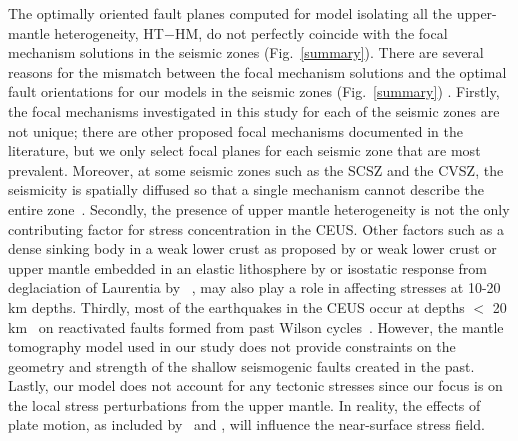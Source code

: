 \documentclass[draft,linenumbers]{agujournal2018}
\begin{document}
     The optimally oriented fault planes computed for model isolating all the upper-mantle heterogeneity, HT$-$HM,  do not perfectly coincide with the focal mechanism solutions in the seismic zones (Fig.~\ref{summary}). There are several reasons for the mismatch between the focal mechanism solutions and the optimal fault orientations for our models in the seismic zones (Fig.~\ref{summary}) . Firstly, the focal mechanisms investigated in this study for each of the seismic zones are not unique; there are other proposed focal mechanisms documented in the literature, but we only select focal planes for each seismic zone that are most prevalent. Moreover, at some seismic zones such as the SCSZ and the CVSZ, the seismicity is spatially diffused so that a single mechanism cannot describe the entire zone~\citep{johnson2014earthquake, munsey1985focal, madabhushi1993fault}.  Secondly, the presence of upper mantle heterogeneity is not the only contributing factor for stress concentration in the CEUS. Other factors such as a dense sinking body in a weak lower crust as proposed by \citet{Pollitz_2001} or weak lower crust or upper mantle embedded in an elastic lithosphere by \citet{Kenner_2000a} or isostatic response from deglaciation of Laurentia by ~\citet{Grollimund_2001}, may also play a role in affecting stresses at 10-20 km depths. Thirdly, most of the earthquakes in the CEUS occur at depths $<$ 20 km~\citep[e.g.,][]{bollinger1985seismicity, chiu1992imaging, powell2016grenville} on reactivated faults formed from past Wilson cycles~\citep{thomas2006tectonic, wolin2012mineral}. However, the mantle tomography model used in our study does not provide constraints on the geometry and strength of the shallow seismogenic faults created in the past. Lastly, our model does not account for any tectonic stresses since our focus is on the local stress perturbations from the upper mantle. In reality, the effects of plate motion, as included by~\citet{zhan2016stress} and \citet{levandowski2016dense}, will influence the near-surface stress field.
%
\end{document}
